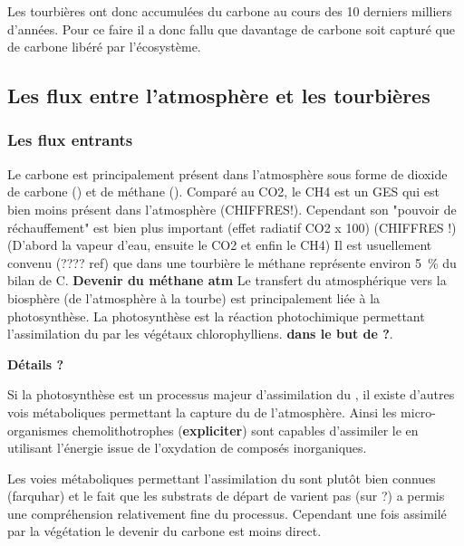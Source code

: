 Les tourbières ont donc accumulées du carbone au cours des 10 derniers milliers d'années.
Pour ce faire il a donc fallu que davantage de carbone soit capturé que de carbone libéré par l'écosystème.


\subsection{Les flux entre l'atmosphère et les tourbières}

\subsubsection{Les flux entrants}

Le carbone est principalement présent dans l'atmosphère sous forme de dioxide de carbone (\COO) et de méthane (\CHH).
Comparé au CO2, le CH4 est un GES qui est bien moins présent dans l'atmosphère (CHIFFRES!).
Cependant son "pouvoir de réchauffement" est bien plus important (effet radiatif CO2 x 100) (CHIFFRES !) (D'abord la vapeur d'eau, ensuite le CO2 et enfin le CH4)
Il est usuellement convenu (???? ref) que dans une tourbière le méthane représente environ \SI{5}{\percent} du bilan de C.
\textbf{Devenir du méthane atm}
Le transfert du \COO atmosphérique vers la biosphère (de l'atmosphère à la tourbe) est principalement \plop liée à la photosynthèse.
La photosynthèse est la réaction photochimique permettant l'assimilation du \COO par les végétaux chlorophylliens.
\textbf{dans le but de ?}.

\textbf{Détails ?}

Si la photosynthèse est un processus majeur d'assimilation du \COO, il existe d'autres vois métaboliques permettant la capture du \COO de l'atmosphère.
Ainsi les micro-organismes chemolithotrophes (\textbf{expliciter}) sont capables d'assimiler le \COO en utilisant l'énergie issue de l'oxydation de composés inorganiques.

Les voies métaboliques permettant l'assimilation du \COO sont plutôt bien connues (farquhar) et le fait que les substrats de départ de varient pas (sur ?) a permis une compréhension relativement fine du processus.
Cependant une fois assimilé par la végétation le devenir du carbone est moins direct.

